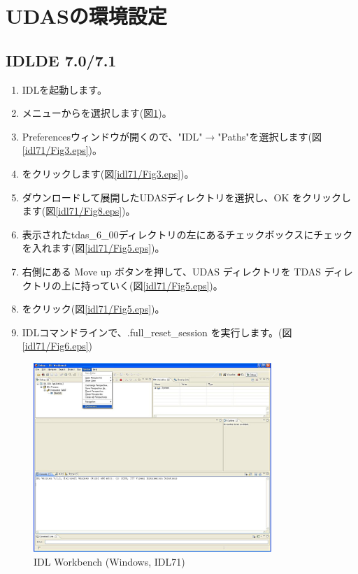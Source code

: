 \documentclass[a4j]{jbook}
\begin{document}
\section{UDASの環境設定}

\subsection{IDLDE 7.0/7.1}

\begin{enumerate}
\item IDLを起動します。
\item {}メニューからを選択します(図\ref{idl71/Fig2.eps})。
\item Preferencesウィンドウが開くので、"IDL"$\rightarrow$"Paths"を選択します(図\ref{idl71/Fig3.eps})。
\item {} をクリックします(図\ref{idl71/Fig3.eps})。
\item ダウンロードして展開したUDASディレクトリを選択し、OK をクリックします(図\ref{idl71/Fig8.eps})。
\item 表示されたtdas\_6\_00ディレクトリの左にあるチェックボックスにチェックを入れます(図\ref{idl71/Fig5.eps})。
\item 右側にある Move up ボタンを押して、UDAS ディレクトリを TDAS ディレクトリの上に持っていく(図\ref{idl71/Fig5.eps})。
\item {}をクリック(図\ref{idl71/Fig5.eps})。
\item IDLコマンドラインで、.full\_reset\_session  を実行します。(図\ref{idl71/Fig6.eps})
\end{enumerate}


\begin{figure}[H]
\begin{center}
\includegraphics[width=9cm]{images/fig_idl71/Fig2.eps}
\caption{IDL Workbench (Windows, IDL71)}
\label{idl71/Fig2.eps}
\end{center}
\end{figure}
\end{document}
